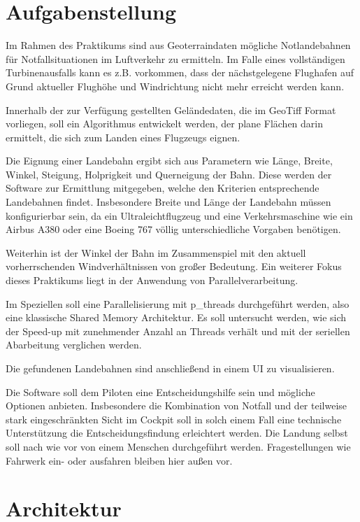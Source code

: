 \documentclass[10pt,a4paper]{report}
\begin{document}
\chapter{Aufgabenstellung}

Im Rahmen des Praktikums sind aus Geoterraindaten mögliche Notlandebahnen für Notfallsituationen im Luftverkehr zu ermitteln. Im Falle eines vollständigen Turbinenausfalls kann es z.B. vorkommen, dass der nächstgelegene Flughafen auf Grund aktueller Flughöhe und Windrichtung nicht mehr erreicht werden kann.

Innerhalb der zur Verfügung gestellten Geländedaten, die im GeoTiff Format vorliegen, soll ein Algorithmus entwickelt werden, der plane Flächen darin ermittelt, die sich zum Landen eines Flugzeugs eignen.

Die Eignung einer Landebahn ergibt sich aus Parametern wie Länge, Breite, Winkel, Steigung, Holprigkeit und Querneigung der Bahn.
Diese werden der Software zur Ermittlung mitgegeben, welche den Kriterien entsprechende Landebahnen findet.
Insbesondere Breite und Länge der Landebahn müssen konfigurierbar sein, da ein Ultraleichtflugzeug und eine Verkehrsmaschine wie ein Airbus A380 oder eine Boeing 767 völlig unterschiedliche Vorgaben benötigen.

Weiterhin ist der Winkel der Bahn im Zusammenspiel mit den aktuell vorherrschenden Windverhältnissen von großer Bedeutung. 
Ein weiterer Fokus dieses Praktikums liegt in der Anwendung von Parallelverarbeitung.

Im Speziellen soll eine Parallelisierung mit p\_threads durchgeführt werden, also eine klassische Shared Memory Architektur.
Es soll untersucht werden, wie sich der Speed-up mit zunehmender Anzahl an Threads verhält und mit der seriellen Abarbeitung verglichen werden.

Die gefundenen Landebahnen sind anschließend in einem UI zu visualisieren.

Die Software soll dem Piloten eine Entscheidungshilfe sein und mögliche Optionen anbieten. Insbesondere die Kombination von Notfall und der teilweise stark eingeschränkten Sicht im Cockpit soll in solch einem Fall eine technische Unterstützung die Entscheidungsfindung erleichtert werden.
Die Landung selbst soll nach wie vor von einem Menschen durchgeführt werden. Fragestellungen wie Fahrwerk ein- oder ausfahren bleiben hier außen vor.     

\chapter{Architektur}
\end{document}

